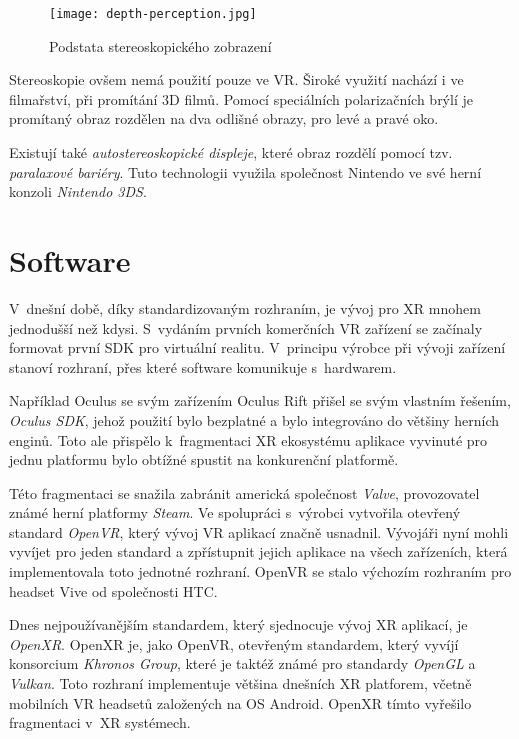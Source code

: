 \begin{figure}[H]
    \centering
    \texttt{[image: depth-perception.jpg]}
    \caption{Podstata stereoskopického zobrazení \cite{stereoskopie_diagram}}
    \label{depth_perception}
\end{figure}

Stereoskopie ovšem nemá použití pouze ve VR. Široké využití nachází i ve filmařství, při promítání 3D filmů. Pomocí speciálních polarizačních brýlí je promítaný obraz rozdělen na dva odlišné obrazy, pro levé a pravé oko. \cite{unitedfilm_stereoskopie}

Existují také \textit{autostereoskopické displeje}, které obraz rozdělí pomocí tzv. \textit{paralaxové bariéry}. Tuto technologii využila společnost Nintendo ve své herní konzoli \textit{Nintendo 3DS}. \cite{enwiki:1158939127}

\chapter{Software}

V~dnešní době, díky standardizovaným rozhraním, je vývoj pro XR mnohem jednodušší než kdysi. S~vydáním prvních komerčních VR zařízení se začínaly formovat první \gls{SDK} pro virtuální realitu. V~principu výrobce při vývoji zařízení stanoví rozhraní, přes které software komunikuje s~hardwarem. 

Například Oculus se svým zařízením Oculus Rift přišel se svým vlastním řešením, \textit{Oculus SDK}, jehož použití bylo bezplatné a bylo integrováno do většiny herních enginů. \cite{enwiki:1193283032} Toto ale přispělo k~fragmentaci XR ekosystému \poml aplikace vyvinuté pro jednu platformu bylo obtížné spustit na konkurenční platformě.

Této fragmentaci se snažila zabránit americká společnost \textit{Valve}, provozovatel známé herní platformy \textit{Steam}. Ve spolupráci s~výrobci vytvořila otevřený standard \textit{OpenVR}, který vývoj VR aplikací značně usnadnil. Vývojáři nyní mohli vyvíjet pro jeden standard a zpřístupnit jejich aplikace na všech zařízeních, která implementovala toto jednotné rozhraní. OpenVR se stalo výchozím rozhraním pro headset Vive od společnosti HTC. \cite{enwiki:1192992480}

Dnes nejpoužívanějším standardem, který sjednocuje vývoj XR aplikací, je \textit{OpenXR}. OpenXR je, jako OpenVR, otevřeným standardem, který vyvíjí konsorcium \textit{Khronos Group}, které je taktéž známé pro standardy \textit{OpenGL} a \textit{Vulkan}. Toto rozhraní implementuje většina dnešních XR platforem, včetně mobilních VR headsetů založených na OS Android. OpenXR tímto vyřešilo fragmentaci v~XR systémech. \cite{enwiki:1186405367}

